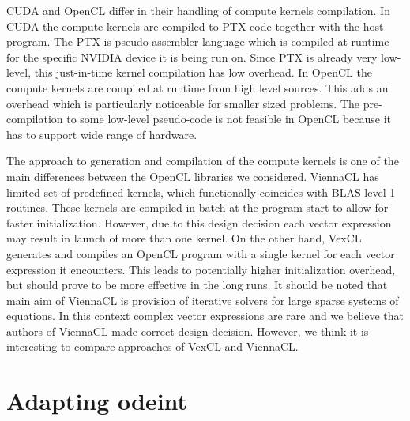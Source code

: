 \documentclass[1p]{elsarticle}
\begin{document}
CUDA and OpenCL differ in their handling of compute kernels compilation. In
CUDA the compute kernels are compiled to PTX code together with the host
program. The PTX is pseudo-assembler language which is compiled at runtime for
the specific NVIDIA device it is being run on. Since PTX is already very
low-level, this just-in-time kernel compilation has low overhead. In OpenCL the
compute kernels are compiled at runtime from high level sources. This adds an
overhead which is particularly noticeable for smaller sized problems. The
pre-compilation to some low-level pseudo-code is not feasible in OpenCL because
it has to support wide range of hardware.

The approach to generation and compilation of the compute kernels is one of the
main differences between the OpenCL libraries we considered.  ViennaCL has
limited set of predefined kernels, which functionally coincides with BLAS level
1 routines.  These kernels are compiled in batch at the program start to allow
for faster initialization. However, due to this design decision each vector
expression may result in launch of more than one kernel.  On the other hand,
VexCL generates and compiles an OpenCL program with a single kernel for each
vector expression it encounters.  This leads to potentially higher
initialization overhead, but should prove to be more effective in the long
runs. It should be noted that main aim of ViennaCL is provision of iterative
solvers for large sparse systems of equations. In this context complex vector
expressions are rare and we believe that authors of ViennaCL made correct
design decision.  However, we think it is interesting to compare approaches of
VexCL and ViennaCL.






%
%
\section{Adapting odeint}
\end{document}
